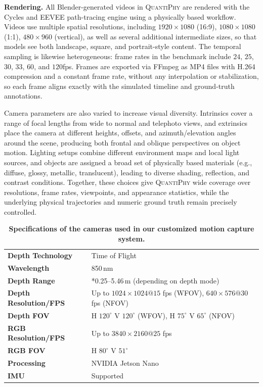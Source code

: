 \noindent\textbf{Rendering.} All Blender-generated videos in \textsc{QuantiPhy} are rendered with the Cycles and EEVEE path-tracing engine using a physically based workflow. Videos use multiple spatial resolutions, including $1920{\times}1080$ (16:9), $1080{\times}1080$ (1:1), $480{\times}960$ (vertical), as well as several additional intermediate sizes, so that models see both landscape, square, and portrait-style content. The temporal sampling is likewise heterogeneous: frame rates in the benchmark include $24$, $25$, $30$, $33$, $60$, and $120$fps. Frames are exported via FFmpeg as MP4 files with H.264 compression and a constant frame rate, without any interpolation or stabilization, so each frame aligns exactly with the simulated timeline and ground-truth annotations.

Camera parameters are also varied to increase visual diversity. Intrinsics cover a range of focal lengths from wide to normal and telephoto views, and extrinsics place the camera at different heights, offsets, and azimuth/elevation angles around the scene, producing both frontal and oblique perspectives on object motion. Lighting setups combine different environment maps and local light sources, and objects are assigned a broad set of physically based materials (e.g., diffuse, glossy, metallic, translucent), leading to diverse shading, reflection, and contrast conditions. Together, these choices give \textsc{QuantiPhy} wide coverage over resolutions, frame rates, viewpoints, and appearance statistics, while the underlying physical trajectories and numeric ground truth remain precisely controlled.



\begin{table}[ht]
\centering
\begin{tabular}{@{}ll@{}}
\toprule
\textbf{Depth Technology}      & Time of Flight \\[3pt]
\textbf{Wavelength}            & 850\,nm \\[3pt]
\textbf{Depth Range}           & *0.25--5.46\,m (depending on depth mode) \\[3pt]
\textbf{Depth Resolution/FPS}  & Up to \(1024 \times 1024@15\) fps (WFOV), \(640 \times 576@30\) fps (NFOV) \\[3pt]
\textbf{Depth FOV}             & H \(120^\circ\) V \(120^\circ\) (WFOV), H \(75^\circ\) V \(65^\circ\) (NFOV) \\[3pt]
\textbf{RGB Resolution/FPS}    & Up to \(3840 \times 2160@25\) fps \\[3pt]
\textbf{RGB FOV}               & H \(80^\circ\) V \(51^\circ\) \\[3pt]
\textbf{Processing}            & NVIDIA Jetson Nano \\[3pt]
\textbf{IMU}                   & Supported \\
\bottomrule
\end{tabular}
\caption{\textbf{Specifications of the cameras used in our customized motion capture system.}}
\label{tab:camera}
\end{table}


